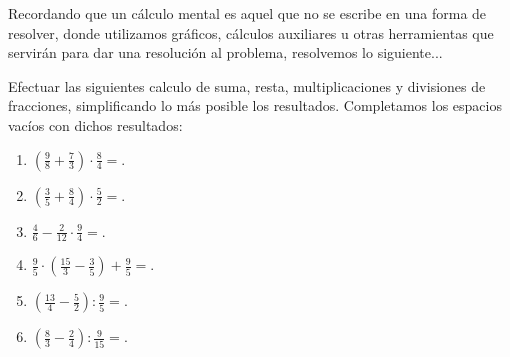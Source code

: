 \documentclass[12pt]{examdesign}
\theoremstyle{plain}
\theoremstyle{definition}
\theoremstyle{remark}
\begin{document}
	
	
	\begin{fillin}[title={Completamos los espacios vacíos:}, resetcounter=no, rearrange=no]
		
		Recordando que un cálculo mental es aquel que no se escribe en una forma de resolver, donde utilizamos gráficos,
		cálculos auxiliares u otras herramientas que servirán para dar una resolución al problema, resolvemos lo siguiente...
		\begin{question}
			Efectuar las siguientes calculo de suma, resta, multiplicaciones y divisiones de fracciones, simplificando lo más posible los resultados. Completamos los espacios vacíos con dichos resultados:
			\begin{enumerate}
				\item $\left( \frac{9}{8}+\frac{7}{3}\right)  \cdot \frac{8}{4}  =$.
				\item $\left( \frac{3}{5}+\frac{8}{4}\right)  \cdot \frac{5}{2}  =$.
				\item $ \frac{4}{6}-\frac{2}{12} \cdot \frac{9}{4} =$.
				\item $\frac{9}{5}\cdot \left( \frac{15}{3}-\frac{3}{5}\right) +\frac{9}{5} =$.
				\item $\left( \frac{13}{4}-\frac{5}{2}\right) : \frac{9}{5}=$.
				\item $\left( \frac{8}{3}-\frac{2}{4}\right):\frac{9}{15} =$.
			\end{enumerate}
		\end{question}
	\end{fillin}
\end{document}
